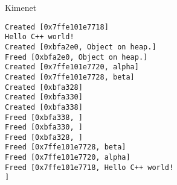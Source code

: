 \documentclass[usenames,dvipsnames,aspectratio=169]{beamer}
\begin{document}
\begin{frame}
    \begin{exampleblock}{}
        \footnotesize
        
    \end{exampleblock}
\end{frame}

\begin{frame}[fragile]
    \begin{block}{Kimenet}
        \scriptsize
        \vspace{-0.3cm}
        \begin{verbatim}
Created [0x7ffe101e7718]
Hello C++ world!
Created [0xbfa2e0, Object on heap.]
Freed [0xbfa2e0, Object on heap.]
Created [0x7ffe101e7720, alpha]
Created [0x7ffe101e7728, beta]
Created [0xbfa328]
Created [0xbfa330]
Created [0xbfa338]
Freed [0xbfa338, ]
Freed [0xbfa330, ]
Freed [0xbfa328, ]
Freed [0x7ffe101e7728, beta]
Freed [0x7ffe101e7720, alpha]
Freed [0x7ffe101e7718, Hello C++ world!
]
\end{verbatim}
        \vspace{-0.3cm}
    \end{block}
\end{frame}
\end{document}
